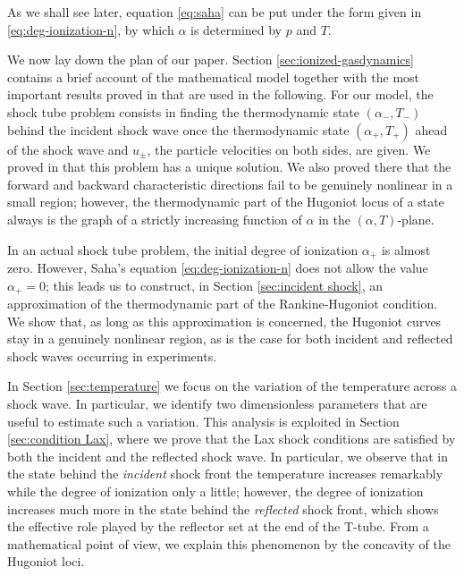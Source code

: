 \documentclass[10pt,a4paper]{article}
\numberwithin{equation}{section}
\begin{document}
As we shall see later, equation \eqref {eq:saha} can be put under the form given in \eqref{eq:deg-ionization-n}, by which $\alpha$ is determined by $p$ and $T.$
\par
We now lay down the plan of our paper. Section \ref{sec:ionized-gasdynamics} contains a brief account of the mathematical model together with the most important results proved in \cite{Asakura-Corli_ionized} that are used in the following. For our model, the shock tube problem consists in finding the thermodynamic state $(\alpha_-, T_-)$ behind the incident shock wave once the thermodynamic state $(\alpha_+, T_+)$ ahead of the shock wave and $u_{\pm}$, the particle velocities on both sides, are given. We proved in \cite{Asakura-Corli_ionized} that this problem has a unique solution. We also proved there that the forward and backward characteristic directions fail to be genuinely nonlinear in a small region; however, the thermodynamic part of the Hugoniot locus of a state always is the graph of a strictly increasing function of $\alpha$ in the $(\alpha, T)$-plane. 
\par
In an actual shock tube problem, the initial degree of ionization $\alpha_+$ is almost zero. However, Saha's equation \eqref{eq:deg-ionization-n} does not allow the value $\alpha_+ = 0$; this leads us to construct, in Section \ref{sec:incident shock}, an approximation of the thermodynamic part of the Rankine-Hugoniot condition. We show that, as long as this approximation is concerned, the Hugoniot curves stay in a genuinely nonlinear region, as is the case for both incident and reflected shock waves occurring in experiments. 
\par
In Section \ref{sec:temperature} we focus on the variation of the temperature across a shock wave. In particular, we identify two dimensionless parameters that are useful to estimate such a variation. This analysis is exploited in Section \ref{sec:condition Lax}, where we prove that the Lax shock conditions \cite{Smoller} are satisfied by both the incident and the reflected shock wave. In particular, we observe that in the state behind the {\em incident} shock front the temperature increases remarkably while the degree of ionization only a little; however, the degree of ionization increases much more in the state behind the {\em reflected} shock front, which shows the effective role played by the reflector set at the end of the T-tube. From a mathematical point of view, we explain this phenomenon by the concavity of the Hugoniot loci.
\end{document}
